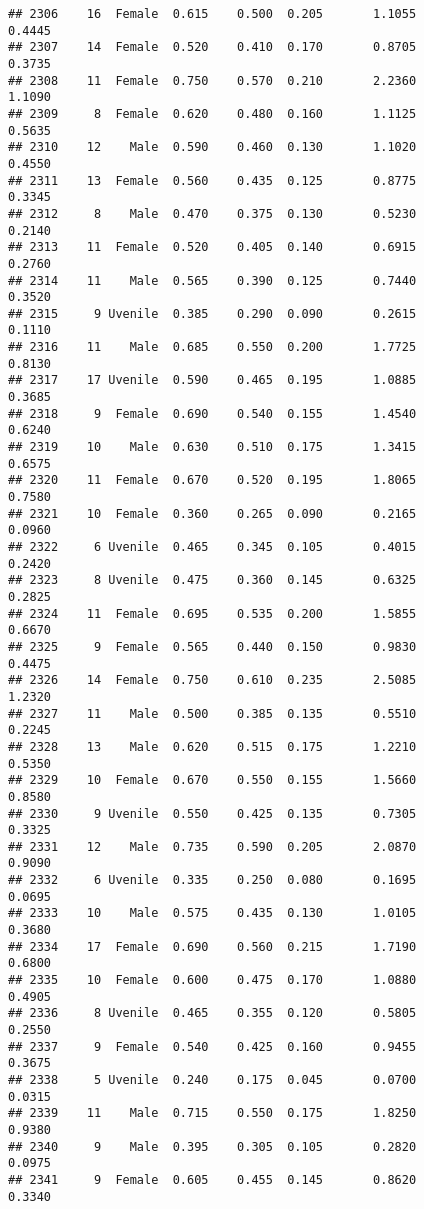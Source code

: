\documentclass[
]{article}
\begin{document}
\begin{verbatim}
## 2306    16  Female  0.615    0.500  0.205       1.1055         0.4445
## 2307    14  Female  0.520    0.410  0.170       0.8705         0.3735
## 2308    11  Female  0.750    0.570  0.210       2.2360         1.1090
## 2309     8  Female  0.620    0.480  0.160       1.1125         0.5635
## 2310    12    Male  0.590    0.460  0.130       1.1020         0.4550
## 2311    13  Female  0.560    0.435  0.125       0.8775         0.3345
## 2312     8    Male  0.470    0.375  0.130       0.5230         0.2140
## 2313    11  Female  0.520    0.405  0.140       0.6915         0.2760
## 2314    11    Male  0.565    0.390  0.125       0.7440         0.3520
## 2315     9 Uvenile  0.385    0.290  0.090       0.2615         0.1110
## 2316    11    Male  0.685    0.550  0.200       1.7725         0.8130
## 2317    17 Uvenile  0.590    0.465  0.195       1.0885         0.3685
## 2318     9  Female  0.690    0.540  0.155       1.4540         0.6240
## 2319    10    Male  0.630    0.510  0.175       1.3415         0.6575
## 2320    11  Female  0.670    0.520  0.195       1.8065         0.7580
## 2321    10  Female  0.360    0.265  0.090       0.2165         0.0960
## 2322     6 Uvenile  0.465    0.345  0.105       0.4015         0.2420
## 2323     8 Uvenile  0.475    0.360  0.145       0.6325         0.2825
## 2324    11  Female  0.695    0.535  0.200       1.5855         0.6670
## 2325     9  Female  0.565    0.440  0.150       0.9830         0.4475
## 2326    14  Female  0.750    0.610  0.235       2.5085         1.2320
## 2327    11    Male  0.500    0.385  0.135       0.5510         0.2245
## 2328    13    Male  0.620    0.515  0.175       1.2210         0.5350
## 2329    10  Female  0.670    0.550  0.155       1.5660         0.8580
## 2330     9 Uvenile  0.550    0.425  0.135       0.7305         0.3325
## 2331    12    Male  0.735    0.590  0.205       2.0870         0.9090
## 2332     6 Uvenile  0.335    0.250  0.080       0.1695         0.0695
## 2333    10    Male  0.575    0.435  0.130       1.0105         0.3680
## 2334    17  Female  0.690    0.560  0.215       1.7190         0.6800
## 2335    10  Female  0.600    0.475  0.170       1.0880         0.4905
## 2336     8 Uvenile  0.465    0.355  0.120       0.5805         0.2550
## 2337     9  Female  0.540    0.425  0.160       0.9455         0.3675
## 2338     5 Uvenile  0.240    0.175  0.045       0.0700         0.0315
## 2339    11    Male  0.715    0.550  0.175       1.8250         0.9380
## 2340     9    Male  0.395    0.305  0.105       0.2820         0.0975
## 2341     9  Female  0.605    0.455  0.145       0.8620         0.3340

\end{verbatim}
\end{document}

